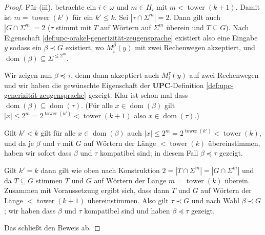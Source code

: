 \documentclass[nofonts]{uebung}
\theoremstyle{definition}
\DeclareMathOperator{\dom}{dom}
\DeclareMathOperator{\tower}{tower}
\begin{document}
\begin{proof}
    Für (iii), betrachte ein $i\in\omega$ und $m\in H_i$ mit $m<\tower(k+1)$. Damit ist $m=\tower(k')$ für ein $k'\leq k$. Sei $|\tau\cap\Sigma^m|=2$.
    Dann gilt auch $|G\cap\Sigma^m|=2$ ($\tau$ stimmt mit $T$ auf Wörtern auf $\Sigma^m$ überein und $T\subseteq G$).
    Nach Eigenschaft \ref{def:upc-orakel-generizität-zeugensprache} existiert also eine Eingabe $y$ sodass ein $\beta\prec G$ existiert, wo $M_i^\beta(y)$ mit zwei Rechenwegen akzeptiert, und $\dom(\beta)\subseteq\Sigma^{\leq 2^m}$.

    Wir zeigen nun $\beta\preceq \tau$, denn dann akzeptiert auch $M_i^\tau(y)$ auf zwei Rechenwegen und wir haben die gewünschte Eigenschaft der $\mathbf{UPC}$-Definition \ref{def:upc-generizität-zeugensprache} gezeigt.
    Klar ist schon mal dass $\dom(\beta)\subseteq\dom(\tau)$. (Für alle $x\in\dom(\beta)$ gilt $|x|\leq 2^m=2^{\tower(k')}<\tower(k+1)$ also $x\in\dom(\tau)$.)

    Gilt $k'<k$ gilt für alle $x\in\dom(\beta)$ auch $|x|\leq 2^m=2^{\tower(k')}<\tower(k)$, und da je $\beta$ und $\tau$ mit $G$ auf Wörtern der Länge ${<\tower(k)}$ übereinstimmen, haben wir sofort dass $\beta$ und $\tau$ kompatibel sind; in diesem Fall $\beta\preceq \tau$ gezeigt.

    Gilt $k'=k$ dann gilt wie oben nach Konstruktion $2=|T\cap\Sigma^m|=|G\cap\Sigma^m|$ und da $T\subseteq G$ stimmen $T$ und $G$ auf Wörtern der Länge $m=\tower(k)$ überein.
    Zusammen mit Voraussetzung ergibt sich, dass dann $T$ und $G$ auf Wörtern der Länge $<\tower(k+1)$ übereinstimmen.
    Also gilt $\tau\prec G$ und nach Wahl $\beta\prec G$; wir haben dass $\beta$ und $\tau$ kompatibel sind und haben $\beta\preceq\tau$ gezeigt.

    Das schließt den Beweis ab.
\end{proof}
\end{document}
